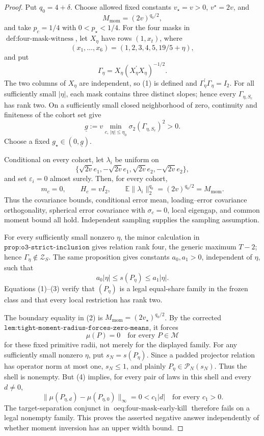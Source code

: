 \documentclass{article}
\begin{document}
\begin{proof}
Put \(q_0=4+\delta\). Choose allowed fixed constants \(v_\star=v>0\), \(v^{\star}=2v\), and
\[
M_{\mathrm{mom}}=(2v)^{q_0/2},
\]
and take \(p_c=1/4\) with \(0<p_\star<1/4\). For the four masks in \(\operatorname{def:four\text{-}mask\text{-}witness}\), let \(X_\eta\) have rows \((1,x_t)\), where
\[
(x_1,\ldots,x_6)=(1,2,3,4,5,19/5+\eta),
\]
and put
\[
\Gamma_\eta=X_\eta(X_\eta^{\prime}X_\eta)^{-1/2}.
\tag{1}
\]
The two columns of \(X_\eta\) are independent, so (1) is defined and \(\Gamma_\eta^{\prime}\Gamma_\eta=I_2\). For all sufficiently small \(|\eta|\), each mask contains three distinct slopes; hence every \(\Gamma_{\eta,S_c}\) has rank two. On a sufficiently small closed neighborhood of zero, continuity and finiteness of the cohort set give
\[
\underline g:=v\min_{c,\,|\eta|\leq\eta_0}
\sigma_2(\Gamma_{\eta,S_c})^2>0.
\]
Choose a fixed \(g_\star\in(0,\underline g)\).

Conditional on every cohort, let \(\lambda_i\) be uniform on
\[
\{\sqrt{2v}e_1,-\sqrt{2v}e_1,
\sqrt{2v}e_2,-\sqrt{2v}e_2\},
\]
and set \(\varepsilon_i=0\) almost surely. Then, for every cohort,
\[
m_c=0,
\qquad
H_c=vI_2,
\qquad
\mathbb E\|\lambda_i\|_2^{q_0}=(2v)^{q_0/2}=M_{\mathrm{mom}}.
\tag{2}
\]
Thus the covariance bounds, conditional error mean, loading--error covariance orthogonality, spherical error covariance with \(\sigma_c=0\), local eigengap, and common moment bound all hold. Independent sampling supplies the sampling assumption.

For every sufficiently small nonzero \(\eta\), the minor calculation in \(\texttt{prop:o3-strict-inclusion}\) gives relation rank four, the generic maximum \(T-2\); hence \(\Gamma_\eta\notin\mathcal Z_S\). The same proposition gives constants \(a_0,a_1>0\), independent of \(\eta\), such that
\[
a_0|\eta|\leq s(P_\eta)\leq a_1|\eta|.
\tag{3}
\]
Equations (1)--(3) verify that \((P_\eta)\) is a legal equal-share family in the frozen class and that every local restriction has rank two.

The boundary equality in (2) is \(M_{\mathrm{mom}}=(2v_\star)^{q_0/2}\). By the corrected \(\texttt{lem:tight-moment-radius-forces-zero-means}\), it forces
\[
\mu(P)=0
\quad\text{for every }P\in\mathcal M
\tag{4}
\]
for these fixed primitive radii, not merely for the displayed family. For any sufficiently small nonzero \(\eta\), put \(s_N=s(P_\eta)\). Since a padded projector relation has operator norm at most one, \(s_N\leq1\), and plainly \(P_\eta\in\mathcal P_N(s_N)\). Thus the shell is nonempty. But (4) implies, for every pair of laws in this shell and every \(d\neq0\),
\[
\|\mu(P_{\eta,d})-\mu(P_{\eta,0})\|_\infty=0
<c_1|d|
\quad\text{for every }c_1>0.
\tag{5}
\]
The target-separation conjunct in \(\operatorname{oeq:four\text{-}mask\text{-}early\text{-}kill}\) therefore fails on a legal nonempty family. This proves the asserted negative answer independently of whether moment inversion has an upper width bound.
\end{proof}
\end{document}
